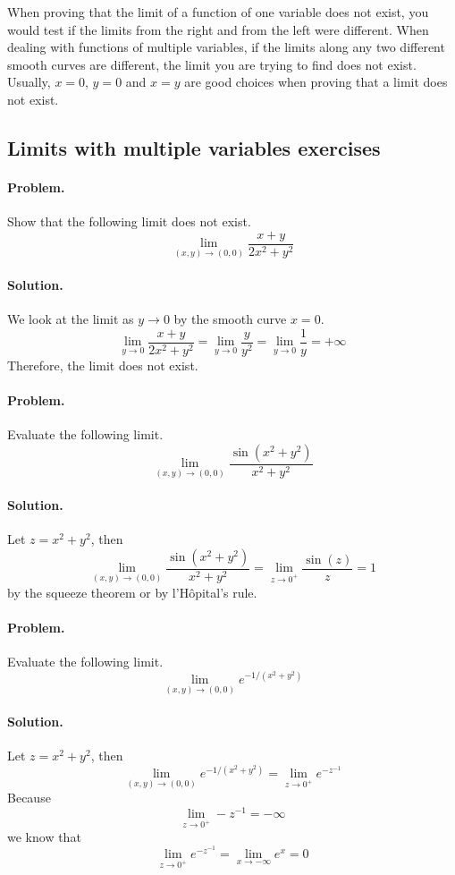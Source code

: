 \documentclass[12pt, oneside]{book}
\begin{document}
When proving that the limit of a function of one variable does not exist, you
would test if the limits from the right and from the left were different.
When dealing with functions of multiple variables, if the limits along any two
different smooth curves are different, the limit you are trying to find does
not exist. Usually, \(x = 0\), \(y = 0\) and \(x = y\) are good choices when
proving that a limit does not exist.

\subsection{Limits with multiple variables exercises}

\paragraph{Problem.}
Show that the following limit does not exist.
\[\lim_{\left(x, y\right) \rightarrow \left(0, 0\right)} \frac{x + y}{2x^2 + y^2}\]
\paragraph{Solution.}
We look at the limit as \(y \rightarrow 0\) by the smooth curve \(x = 0\).
\[\lim_{y \rightarrow 0} \frac{x + y}{2x^2 + y^2}
= \lim_{y \rightarrow 0} \frac{y}{y^2}
= \lim_{y \rightarrow 0} \frac{1}{y} = +\infty\]
Therefore, the limit does not exist.

\paragraph{Problem.}
Evaluate the following limit.
\[\lim_{\left(x, y\right) \rightarrow \left(0, 0\right)} \frac{\sin \left(x^2 + y^2\right)}{x^2 + y^2}\]
\paragraph{Solution.}
Let \(z = x^2 + y^2\), then
\[\lim_{\left(x, y\right) \rightarrow \left(0, 0\right)} \frac{\sin \left(x^2 + y^2\right)}{x^2 + y^2}
= \lim_{z \rightarrow 0^+} \frac{\sin \left(z\right)}{z}
= 1\]
by the squeeze theorem or by l'Hôpital's rule.

\paragraph{Problem.}
Evaluate the following limit.
\[\lim_{\left(x, y\right) \rightarrow \left(0, 0\right)} e^{-1/\left(x^2 + y^2\right)}\]
\paragraph{Solution.}
Let \(z = x^2 + y^2\), then
\[\lim_{\left(x, y\right) \rightarrow \left(0, 0\right)} e^{-1/\left(x^2 + y^2\right)}
= \lim_{z \rightarrow 0^+} e^{-z^{-1}}\]
Because \[\lim_{z \rightarrow 0^+} -z^{-1} = -\infty\]
we know that \[\lim_{z \rightarrow 0^+} e^{-z^{-1}} = \lim_{x \rightarrow -\infty} e^{x} = 0\]
\end{document}
